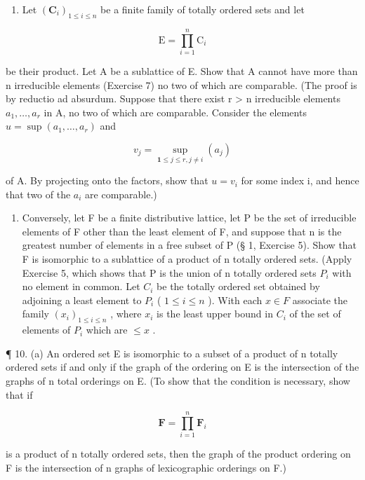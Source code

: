 \begin{enumerate}
\def\labelenumi{(\alph{enumi})}
\tightlist
\item
  Let \((\mathbf{C}_i)_{1\leqslant i\leqslant n}\) be a finite family of totally ordered sets and let
\end{enumerate}

\[
\mathrm{E} = \prod_ {i = 1} ^ {n} \mathrm{C} _ {i}
\]

be their product. Let A be a sublattice of E. Show that A cannot have more than n irreducible elements (Exercise 7) no two of which are comparable. (The proof is by reductio ad absurdum. Suppose that there exist r \textgreater{} n irreducible elements \(a_{1}, \ldots, a_{r}\) in A, no two of which are comparable. Consider the elements \(u = \sup(a_{1}, \ldots, a_{r})\) and

\[
v _ {j} = \sup _ {\mathbf {1} \leqslant j \leqslant r, j \neq i} (a _ {j})
\]

of A. By projecting onto the factors, show that \(u = v_{i}\) for some index i, and hence that two of the \(a_{i}\) are comparable.)

\begin{enumerate}
\def\labelenumi{(\alph{enumi})}
\setcounter{enumi}{1}
\tightlist
\item
  Conversely, let F be a finite distributive lattice, let P be the set of irreducible elements of F other than the least element of F, and suppose that n is the greatest number of elements in a free subset of P (§ 1, Exercise 5). Show that F is isomorphic to a sublattice of a product of n totally ordered sets. (Apply Exercise 5, which shows that P is the union of n totally ordered sets \(P_{i}\) with no element in common. Let \(C_{i}\) be the totally ordered set obtained by adjoining a least element to \(P_{i}\) ( \(1 \leqslant i \leqslant n\) ). With each \(x \in F\) associate the family \((x_{i})_{1 \leqslant i \leqslant n}\) , where \(x_{i}\) is the least upper bound in \(C_{i}\) of the set of elements of \(P_{i}\) which are \(\leqslant x\) .
\end{enumerate}

¶ 10. (a) An ordered set E is isomorphic to a subset of a product of n totally ordered sets if and only if the graph of the ordering on E is the intersection of the graphs of n total orderings on E. (To show that the condition is necessary, show that if

\[
\mathbf {F} = \prod_ {i = 1} ^ {n} \mathbf {F} _ {i}
\]

is a product of n totally ordered sets, then the graph of the product ordering on F is the intersection of n graphs of lexicographic orderings on F.)

